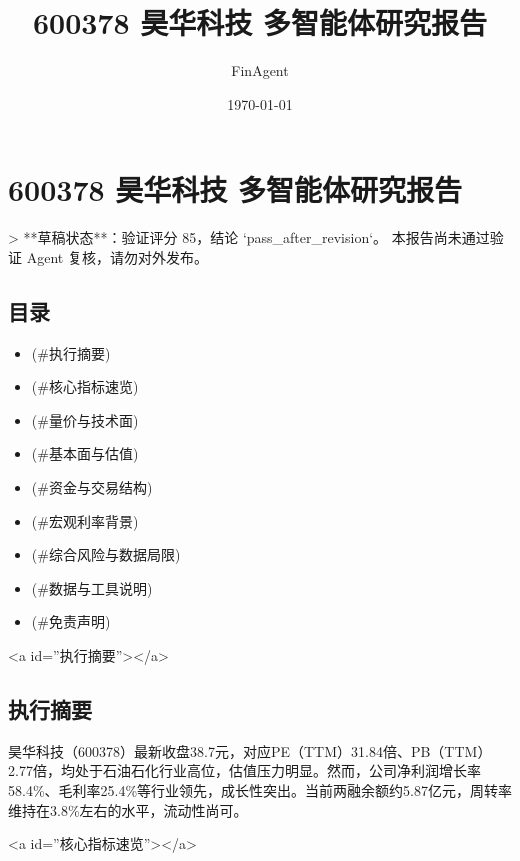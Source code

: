 \documentclass[12pt,a4paper]{article}
\title{600378 昊华科技 多智能体研究报告}
\author{FinAgent}
\date{\today}
\begin{document}
\maketitle
\tableofcontents
\newpage
\sloppy
\section{600378 昊华科技 多智能体研究报告}

> **草稿状态**：验证评分 85，结论 `pass\_after\_revision`。 本报告尚未通过验证 Agent 复核，请勿对外发布。

\subsection{ 目录}

\begin{itemize}
\item [执行摘要](\#执行摘要)
\item [核心指标速览](\#核心指标速览)
\item [量价与技术面](\#量价与技术面)
\item [基本面与估值](\#基本面与估值)
\item [资金与交易结构](\#资金与交易结构)
\item [宏观利率背景](\#宏观利率背景)
\item [综合风险与数据局限](\#综合风险与数据局限)
\item [数据与工具说明](\#数据与工具说明)
\item [免责声明](\#免责声明)
\end{itemize}

<a id=''执行摘要''></a>

\subsection{ 执行摘要}
昊华科技（600378）最新收盘38.7元，对应PE（TTM）31.84倍、PB（TTM）2.77倍，均处于石油石化行业高位，估值压力明显。然而，公司净利润增长率58.4\%、毛利率25.4\%等行业领先，成长性突出。当前两融余额约5.87亿元，周转率维持在3.8\%左右的水平，流动性尚可。

<a id=''核心指标速览''></a>
\end{document}
